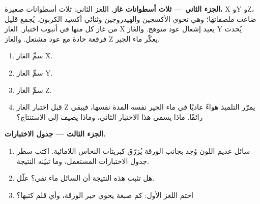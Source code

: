 \begin{problem}
\medskip
\noindent\textbf{الجزء الثاني --- ثلاث أسطوانات غاز.}
اللغز الثاني: ثلاث أسطوانات صغيرة، X وY وZ، ضاعت ملصقاتها؛ وهي تحوي
الأكسجين والهيدروجين وثنائي أكسيد الكربون. يُجمع قليل من غاز كل منها في
أنبوب اختبار. الغاز X يعيد إشعال عود متوهج. والغاز Y يُحدث فرقعة حادة
مع عود مشتعل. والغاز Z يعكّر ماء الجير.
\begin{enumerate}[resume]
  \item سمِّ الغاز X.
  \item سمِّ الغاز Y.
  \item سمِّ الغاز Z.
  \item قبل اختبار الغاز Z يمرّر التلميذ هواءً عاديًا في ماء الجير نفسه
        المدة نفسها، فيبقى رائقًا. ماذا يسمى هذا الاختبار الثاني، وماذا
        يضيف إلى الاستنتاج؟
\end{enumerate}

\medskip
\noindent\textbf{الجزء الثالث --- جدول الاختبارات.}
\begin{enumerate}[resume]
  \item سائل عديم اللون وُجد بجانب الورقة يُزرّق كبريتات النحاس
        اللامائية. اكتب سطر جدول الاختبارات المستعمل، وما تبيّنه
        النتيجة.
  \item هل تثبت هذه النتيجة أن السائل ماء نقي؟ علّل.
  \item اختم اللغز الأول: كم صبغة يحوي حبر الورقة، وأي قلم
        كتبها؟
\end{enumerate}
\end{problem}
